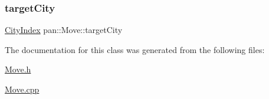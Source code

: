 \subsubsection{\texorpdfstring{target\+City}{targetCity}}
{\footnotesize\ttfamily \hyperlink{namespacepan_afaed28aa6603153dcc062a028602d697}{City\+Index} pan\+::\+Move\+::target\+City}



The documentation for this class was generated from the following files\+:\begin{DoxyCompactItemize}
\item 
\hyperlink{_move_8h}{Move.\+h}\item 
\hyperlink{_move_8cpp}{Move.\+cpp}\end{DoxyCompactItemize}

